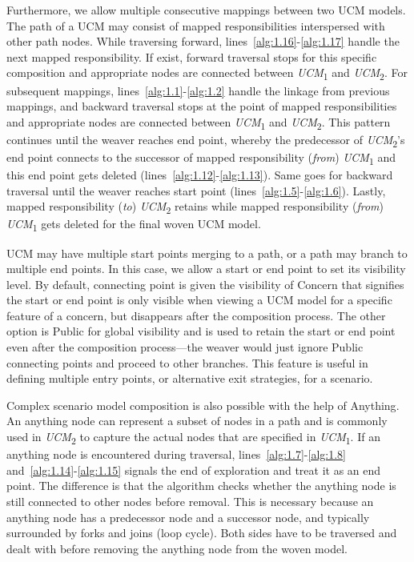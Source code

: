 Furthermore, we allow multiple consecutive mappings between two UCM models. The path of a UCM may consist of mapped responsibilities interspersed with other path nodes. While traversing forward, lines~\ref{alg:1.16}-\ref{alg:1.17} handle the next mapped responsibility. If exist, forward traversal stops for this specific composition and appropriate nodes are connected between \emph{UCM}\textsubscript{1} and \emph{UCM}\textsubscript{2}. For subsequent mappings, lines~\ref{alg:1.1}-\ref{alg:1.2} handle the linkage from previous mappings, and backward traversal stops at the point of mapped responsibilities and appropriate nodes are connected between \emph{UCM}\textsubscript{1} and \emph{UCM}\textsubscript{2}. This pattern continues until the weaver reaches end point, whereby the predecessor of \emph{UCM}\textsubscript{2}'s end point connects to the successor of mapped responsibility (\emph{from}) \emph{UCM}\textsubscript{1} and this end point gets deleted (lines~\ref{alg:1.12}-\ref{alg:1.13}). Same goes for backward traversal until the weaver reaches start point (lines~\ref{alg:1.5}-\ref{alg:1.6}). Lastly, mapped responsibility (\emph{to}) \emph{UCM}\textsubscript{2} retains while mapped responsibility (\emph{from}) \emph{UCM}\textsubscript{1} gets deleted for the final woven UCM model.

UCM may have multiple start points merging to a path, or a path may branch to multiple end points. In this case, we allow a start or end point to set its visibility level. By default, connecting point is given the visibility of {\cls Concern} that signifies the start or end point is only visible when viewing a UCM model for a specific feature of a concern, but disappears after the composition process. The other option is {\cls Public} for global visibility and is used to retain the start or end point even after the composition process---the weaver would just ignore {\cls Public} connecting points and proceed to other branches. This feature is useful in defining multiple entry points, or alternative exit strategies, for a scenario.

Complex scenario model composition is also possible with the help of {\cls Anything}. An anything node can represent a subset of nodes in a path and is commonly used in \emph{UCM}\textsubscript{2} to capture the actual nodes that are specified in \emph{UCM}\textsubscript{1}. If an anything node is encountered during traversal, lines~\ref{alg:1.7}-\ref{alg:1.8} and~\ref{alg:1.14}-\ref{alg:1.15} signals the end of exploration and treat it as an end point. The difference is that the algorithm checks whether the anything node is still connected to other nodes before removal. This is necessary because an anything node has a predecessor node and a successor node, and typically surrounded by forks and joins (loop cycle). Both sides have to be traversed and dealt with before removing the anything node from the woven model.

